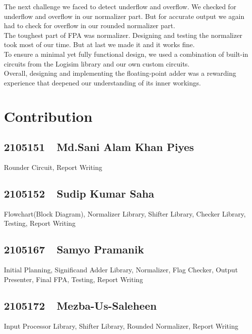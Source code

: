 \documentclass[a4paper,12pt]{article}
\begin{document}
The next challenge we faced to detect underflow and overflow. We checked for
underflow and overflow in our normalizer part. But for accurate output we again
had to check for overflow in our rounded normalizer part.\\

The toughest part of FPA was normalizer. Designing and testing the normalizer
took most of our time. But at last we made it and it works fine.\\

To ensure a minimal yet fully functional design, we used a combination of
built-in circuits from the Logisim library and our own custom circuits.\\

Overall, designing and implementing the floating-point adder was a rewarding
experience that deepened our understanding of its inner workings.

\section{Contribution}
\subsection*{2105151~~Md.Sani Alam Khan Piyes}
Rounder Circuit, Report Writing

\subsection*{2105152~~Sudip Kumar Saha}
Flowchart(Block Diagram), Normalizer Library, Shifter Library, Checker Library,
Testing, Report Writing

\subsection*{2105167~~Samyo Pramanik}
Initial Planning, Significand Adder Library, Normalizer, Flag Checker, Output
Presenter, Final FPA, Testing, Report Writing

\subsection*{2105172~~Mezba-Us-Saleheen}
Input Processor Library, Shifter Library, Rounded Normalizer, Report Writing
\end{document}
